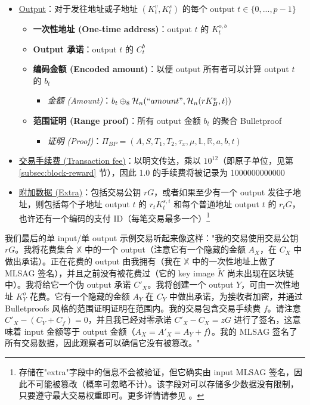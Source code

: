 {\begin{itemize}
    \item \underline{Output}：对于发往地址或子地址 $(K^v_t,K^s_t)$ 的每个 output $t \in \{0,...,p-1\}$
    \begin{itemize}
        \item \textbf{一次性地址 (One-time address)}：output $t$ 的 $K^{o,b}_t$
        \item \textbf{Output 承诺}：output $t$ 的 $C^{b}_t$
        \item \textbf{编码金额 (Encoded amount)}：以便 output 所有者可以计算 output $t$ 的 $b_t$
        \begin{itemize}
            \item \textit{金额 (Amount)}：$b_t \oplus_8 \mathcal{H}_n(``amount", \mathcal{H}_n(r K_B^v, t))$
        \end{itemize}
        \item \textbf{范围证明 (Range proof)}：所有 output 金额 $b_t$ 的聚合 Bulletproof
        \begin{itemize}
            \item \textit{证明 (Proof)}：$\Pi_{BP} = (A, S, T_1, T_2, \tau_x, \mu, \mathbb{L}, \mathbb{R}, a, b, t)$
        \end{itemize}
    \end{itemize}
    \item \underline{交易手续费 (Transaction fee)}：以明文传达，乘以 $10^{12}$（即原子单位，见第 \ref{subsec:block-reward} 节），因此 1.0 的手续费将被记录为 1000000000000
    \item \underline{附加数据 (Extra)}：包括交易公钥 $r G$，或者如果至少有一个 output 发往子地址，则包括每个子地址 output $t$ 的 $r_t K^{s,i}_t$ 和每个普通地址 output $t$ 的 $r_t G$，也许还有一个编码的支付 ID（每笔交易最多一个）\footnote{存储在"extra"字段中的信息不会被验证，但它{确实}由 input MLSAG 签名，因此不可能被篡改（概率可忽略不计）。该字段对可以存储多少数据没有限制，只要遵守最大交易权重即可。更多详情请参见 \cite{extra-field-stackexchange}。}
\end{itemize}

我们最后的单 input/单 output 示例交易听起来像这样："我的交易使用交易公钥 $r G$。我将花费集合 $\mathbb{X}$ 中的一个 output（注意它有一个隐藏的金额 $A_X$，在 $C_X$ 中做出承诺）。正在花费的 output 由我拥有（我在 $\mathbb{X}$ 中的一次性地址上做了 MLSAG 签名），并且之前没有被花费过（它的 key image $\tilde{K}$ 尚未出现在区块链中）。我将给它一个伪 output 承诺 $C'_X$。我将创建一个 output $Y$，可由一次性地址 $K^o_Y$ 花费。它有一个隐藏的金额 $A_Y$ 在 $C_Y$ 中做出承诺，为接收者加密，并通过 Bulletproofs 风格的范围证明证明在范围内。我的交易包含交易手续费 $f$。请注意 $C'_X - (C_Y + C_f) = 0$，并且我已经对零承诺 $C'_X - C_X = z G$ 进行了签名，这意味着 input 金额等于 output 金额（$A_X = A'_X = A_Y + f$）。我的 MLSAG 签名了所有交易数据，因此观察者可以确信它没有被篡改。"


}
